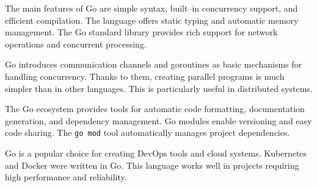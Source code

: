 The main features of Go are simple syntax, built--in concurrency support, and efficient compilation.
The language offers static typing and automatic memory management.
The Go standard library provides rich support for network operations and concurrent processing.

Go introduces communication channels and goroutines as basic mechanisms for handling concurrency.
Thanks to them, creating parallel programs is much simpler than in other languages.
This is particularly useful in distributed systems.

The Go ecosystem provides tools for automatic code formatting, documentation generation, and dependency management.
Go modules enable versioning and easy code sharing.
The \texttt{go mod} tool automatically manages project dependencies.

Go is a popular choice for creating DevOps tools and cloud systems.
Kubernetes and Docker were written in Go. This language works well in projects requiring high performance and reliability.